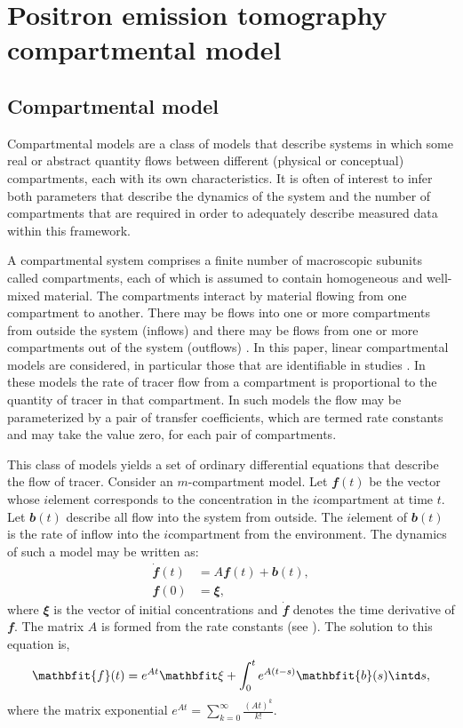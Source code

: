 \chapter{Positron emission tomography compartmental model}
\label{cha:Positron emission tomography compartmental model}

\section{Compartmental model}
\label{sec:Compartmental model}

Compartmental models are a class of models that describe systems in which some
real or abstract quantity flows between different (physical or conceptual)
compartments, each with its own characteristics. It is often of interest to
infer both parameters that describe the dynamics of the system and the number
of compartments that are required in order to adequately describe measured
data within this framework.

A compartmental system comprises a finite number of macroscopic subunits
called compartments, each of which is assumed to contain homogeneous and
well-mixed material. The compartments interact by material flowing from one
compartment to another. There may be flows into one or more compartments from
outside the system (inflows) and there may be flows from one or more
compartments out of the system (outflows) \cite{Jacquez:1996gc}. In this
paper, linear compartmental models are considered, in particular those that
are identifiable in \pet studies \cite{Schmidt99}. In these models the rate
of tracer flow from a compartment is proportional to the quantity of tracer in
that compartment. In such models the flow may be parameterized by a pair of
transfer coefficients, which are termed rate constants and may take the value
zero, for each pair of compartments.

This class of models yields a set of ordinary differential equations that
describe the flow of tracer. Consider an $m$-compartment model. Let
$\mathbfit{f}(t)$ be the vector whose $i$\xth element corresponds to the
concentration in the $i$\xth compartment at time $t$. Let $\mathbfit{b}(t)$
describe all flow into the system from outside. The $i$\xth element of
$\mathbfit{b}(t)$ is the rate of inflow into the $i$\xth compartment from the
environment. The dynamics of such a model may be written as:
\begin{align*}
  \dot{\mathbfit{f}}(t) &= A\mathbfit{f}(t) + \mathbfit{b}(t), \\
  \mathbfit{f}(0) &= \mathbfit\xi,
\end{align*}
where $\mathbfit\xi$ is the vector of initial concentrations and
$\dot{\mathbfit{f}}$
denotes the time derivative of $\mathbfit{f}$. The matrix $A$ is formed from
the rate constants (see \cite{Gunn:2001cx}).  The solution to this equation
is,
\begin{equation*}
  \mathbfit{f}(t) = e^{A t}\mathbfit\xi + \int_0^t e^{A(t-s)}\mathbfit{b}(s)\intd s,
\end{equation*}
where the matrix exponential $e^{A t} = \sum_{k = 0}^{\infty}
\frac{(A t)^k}{k!}$.

